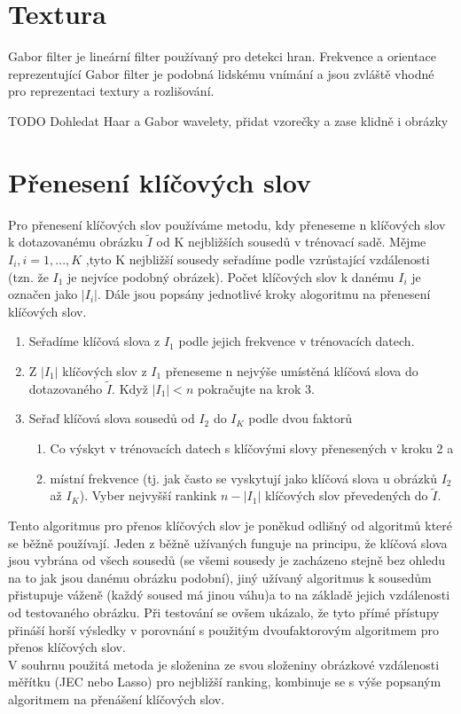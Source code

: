 \documentclass[czech,BP]{thesiskiv}
\begin{document}
\section{Textura}
Gabor filter je lineární filter používaný pro detekci hran. Frekvence a orientace reprezentující Gabor filter je podobná lidskému vnímání a jsou zvláště vhodné pro reprezentaci textury a rozlišování. 

TODO Dohledat Haar a Gabor wavelety, přidat vzorečky a zase klidně i obrázky


\section{Přenesení klíčových slov}
Pro přenesení klíčových slov používáme metodu, kdy přeneseme n klíčových slov k dotazovanému obrázku $\tilde{I}$ od K nejbližších sousedů v trénovací sadě. Mějme $I_{i}, i = 1, ..., K$ ,tyto K nejbližší sousedy seřadíme podle vzrůstající vzdálenosti (tzn. že $I_{1} $ je nejvíce podobný obrázek). Počet klíčových slov k danému $I_{i}$ je označen jako $|I_{i}|$. Dále jsou popsány jednotlivé kroky alogoritmu na přenesení klíčových slov.
\begin{enumerate}
	\item Seřadíme klíčová slova z $I_{1}$ podle jejich frekvence v trénovacích datech.
	\item Z $|I_{1}|$ klíčových slov z $I_{1}$ přeneseme n nejvýše umístěná klíčová slova do dotazovaného $\tilde{I}$. Když $|I_{1}| < n$ pokračujte na krok 3. 
	\item Seřaď klíčová slova sousedů od $I_{2}$ do $I_{K}$ podle dvou faktorů
	\begin{enumerate}
		\item Co výskyt v trénovacích datech s klíčovými slovy přenesených v kroku 2 a
		\item místní frekvence (tj. jak často se vyskytují jako klíčová slova u obrázků $I_{2}$ až $I_{K}$). Vyber nejvyšší rankink $n-|I_{1}|$ klíčových slov převedených do $\tilde{I}$.
	\end{enumerate}
\end{enumerate}

Tento algoritmus pro přenos klíčových slov je poněkud odlišný od algoritmů které se běžně používají. Jeden z běžně užívaných funguje na principu, že klíčová slova jsou vybrána od všech sousedů (se všemi sousedy je zacházeno stejně bez ohledu na to jak jsou danému obrázku podobní), jiný užívaný algoritmus k sousedům přistupuje váženě (každý soused má jinou váhu)a to na základě jejich vzdálenosti od testovaného obrázku. Při testování se ovšem ukázalo, že tyto přímé přístupy přináší horší výsledky v porovnání s použitým dvoufaktorovým algoritmem pro přenos klíčových slov. \\
V souhrnu použitá metoda je složenina ze svou složeniny obrázkové vzdálenosti měřítku (JEC nebo Lasso) pro nejbližší ranking, kombinuje se s výše popsaným algoritmem na přenášení klíčových slov.
\end{document}
